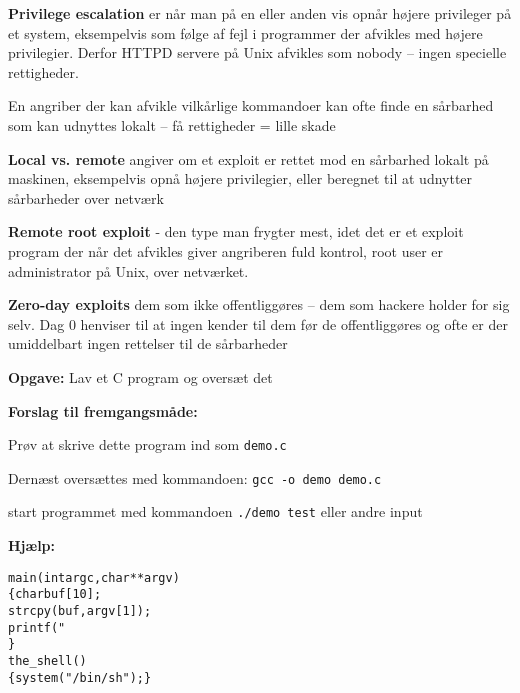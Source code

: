 \documentclass[20pt,landscape,a4paper,footrule]{foils}
\begin{document}
\begin{list1}
\item {\bfseries Privilege escalation} er når man på en eller anden vis
opnår højere privileger på et system, eksempelvis som
følge af fejl i programmer der afvikles med højere
privilegier. Derfor HTTPD servere på Unix afvikles som
nobody -- ingen specielle rettigheder.
\item En angriber der kan afvikle vilkårlige kommandoer kan ofte finde
  en sårbarhed som kan udnyttes lokalt -- få rettigheder = lille skade
\end{list1}



\begin{list1}
\item {\bfseries Local vs. remote}
angiver om et exploit er rettet mod
en sårbarhed lokalt på maskinen, eksempelvis
opnå højere privilegier, eller beregnet
til at udnytter sårbarheder over netværk
\item {\bfseries Remote root exploit}
- den type man frygter mest, idet
det er et exploit program der når det afvikles giver
angriberen fuld kontrol, root user er administrator
på Unix, over netværket.
\item {\bfseries Zero-day exploits} dem som ikke offentliggøres -- dem
  som hackere holder for sig selv. Dag 0 henviser til at ingen kender
  til dem før de offentliggøres og ofte er der umiddelbart ingen
  rettelser til de sårbarheder
\end{list1}





{\bfseries Opgave:} Lav et C program og oversæt det

{\bfseries Forslag til fremgangsmåde:}
\begin{list2}
\item Prøv at skrive dette program ind som \verb+demo.c+
\item Dernæst oversættes med kommandoen:
\verb+gcc -o demo demo.c+
\item start programmet med kommandoen
\verb+./demo test+ eller andre input
\end{list2}

{\bfseries Hjælp:}
\begin{alltt}
main(int argc, char **argv)
\{      char buf[10];
        strcpy(buf, argv[1]);
        printf("%s\textbackslash{}n",buf);
\}
the_shell()
\{  system("/bin/sh");  \}
\end{alltt}
\end{document}
